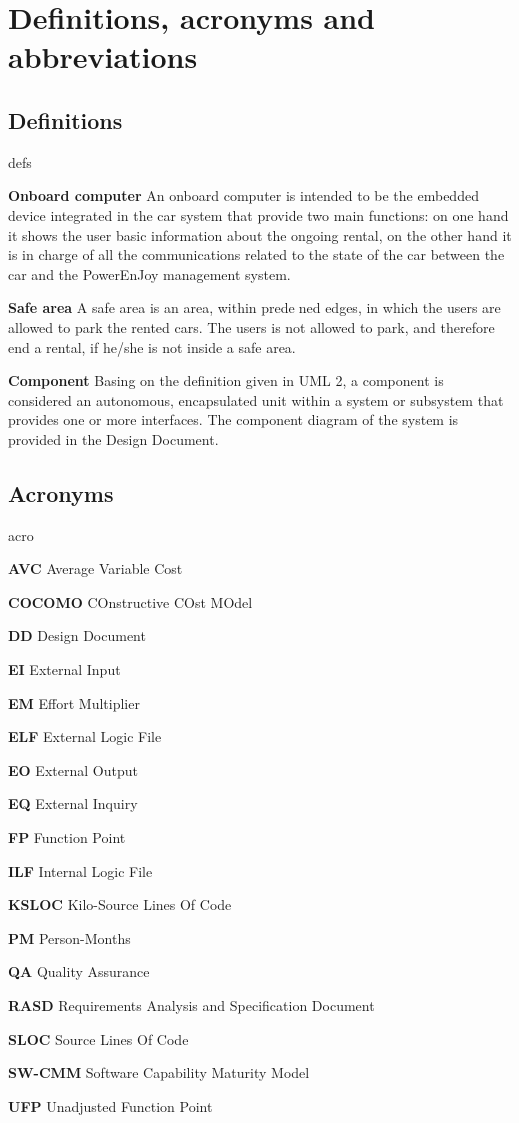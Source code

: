 \section{Definitions, acronyms and abbreviations}

\subsection{Definitions}
\begin{labeling}{defs}
		\item[\textbf{Onboard computer}] An onboard computer is intended to be the embedded device integrated in the car system that provide two main functions: on one hand it shows the user basic information about the ongoing rental, on the other hand it is in charge of all the communications related to the state of the car between the car and the PowerEnJoy management system.
		\item[\textbf{Safe area}] A safe area is an area, within predened edges, in which the users are allowed to park the rented cars. The users is not allowed to park, and therefore end a rental, if he/she is not inside a safe area.
		\item[\textbf{Component}] Basing on the definition given in UML 2, a component is considered an autonomous, encapsulated unit within a system or subsystem that provides one or more interfaces. The component diagram of the system is provided in the Design Document.
	\end{labeling}

\subsection{Acronyms}
	\begin{labeling}{acro}
		\item[\textbf{AVC}] Average Variable Cost
		\item[\textbf{COCOMO}] COnstructive COst MOdel
		\item[\textbf{DD}] Design Document
		\item[\textbf{EI}] External Input
		\item[\textbf{EM}] Effort Multiplier
		\item[\textbf{ELF}] External Logic File
		\item[\textbf{EO}] External Output
		\item[\textbf{EQ}] External Inquiry
		\item[\textbf{FP}] Function Point
		\item[\textbf{ILF}] Internal Logic File
		\item[\textbf{KSLOC}] Kilo-Source Lines Of Code
		\item[\textbf{PM}] Person-Months
		\item[\textbf{QA}] Quality Assurance
		\item[\textbf{RASD}] Requirements Analysis and Specification Document
		\item[\textbf{SLOC}] Source Lines Of Code
		\item[\textbf{SW-CMM}] Software Capability Maturity Model
		\item[\textbf{UFP}] Unadjusted Function Point
	\end{labeling}

